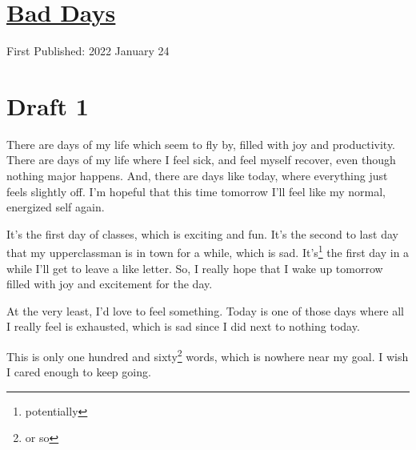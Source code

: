 \documentclass[12pt]{article}[titlepage]
\newcommand{\1}{\={a}}
\newcommand{\2}{\={e}}
\newcommand{\3}{\={\i}}
\newcommand{\4}{\=o}
\newcommand{\5}{\=u}
\newcommand{\6}{\={A}}
\renewcommand{\,}{\textsuperscript{,}}
\begin{document}
\doublespacing
\section{\href{bad-days.html}{Bad Days}}
First Published: 2022 January 24

\section{Draft 1}
There are days of my life which seem to fly by, filled with joy and productivity.
There are days of my life where I feel sick, and feel myself recover, even though nothing major happens.
And, there are days like today, where everything just feels slightly off.
I'm hopeful that this time tomorrow I'll feel like my normal, energized self again.

It's the first day of classes, which is exciting and fun.
It's the second to last day that my upperclassman is in town for a while, which is sad.
It's\footnote{potentially} the first day in a while I'll get to leave a like letter.
So, I really hope that I wake up tomorrow filled with joy and excitement for the day.

At the very least, I'd love to feel something.
Today is one of those days where all I really feel is exhausted, which is sad since I did next to nothing today.

This is only one hundred and sixty\footnote{or so} words, which is nowhere near my goal.
I wish I cared enough to keep going.
\end{document}
